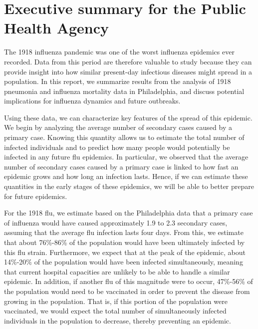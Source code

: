 \documentclass[12pt]{article}\usepackage[]{graphicx}\usepackage[]{color}
\begin{document}
\section{Executive summary for the Public Health Agency}

\ExecSumm
\newpage
The 1918 influenza pandemic was one of the worst influenza epidemics ever recorded. Data from this period are therefore valuable to study because they can provide insight into how similar present-day infectious diseases might spread in a population. In this report, we summarize results from the analysis of 1918 pneumonia and influenza mortality data in Philadelphia, and discuss potential implications for influenza dynamics and future outbreaks. \newline

Using these data, we can characterize key features of the spread of this epidemic. We begin by analyzing the average number of secondary cases caused by a primary case. Knowing this quantity allows us to estimate the total number of infected individuals and to predict how many people would potentially be infected in any future flu epidemics. In particular, we observed that the average number of secondary cases caused by a primary case is linked to how fast an epidemic grows and how long an infection lasts. Hence, if we can estimate these quantities in the early stages of these epidemics, we will be able to better prepare for future epidemics. \newline

For the 1918 flu, we estimate based on the Philadelphia data that a primary case of influenza would have caused approximately 1.9 to 2.3 secondary cases, assuming that the average flu infection lasts four days. From this, we estimate that about 76\%-86\% of the population would have been ultimately infected by this flu strain. Furthermore, we expect that at the peak of the epidemic, about 14\%-20\% of the population would have been infected simultaneously, meaning that current hospital capacities are unlikely to be able to handle a similar epidemic. In addition, if another flu of this magnitude were to occur, 47\%-56\% of the population would need to be vaccinated in order to prevent the disease from growing in the population. That is, if this portion of the population were vaccinated, we would expect the total number of simultaneously infected individuals in the population to decrease, thereby preventing an epidemic. \newline
\end{document}
